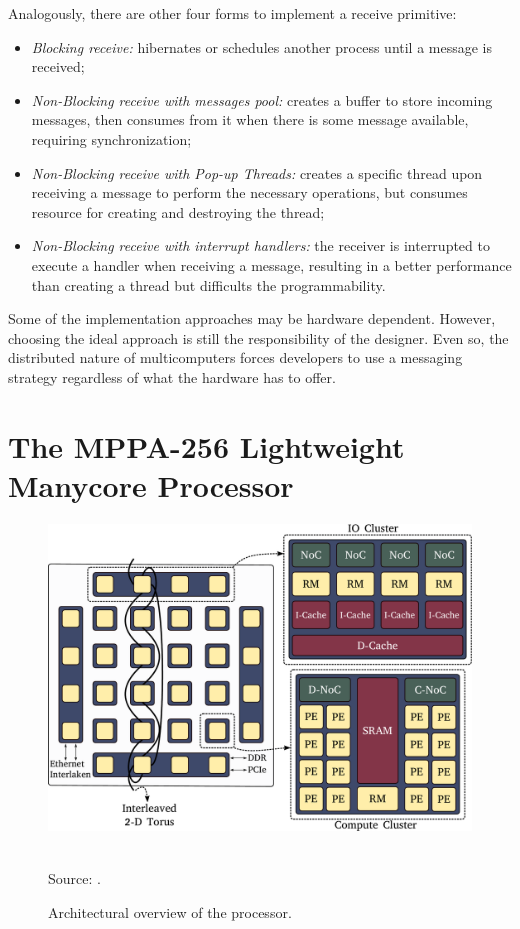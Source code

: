 				Analogously, there are other four forms to implement a receive primitive:
				\begin{itemize}
					\item \textit{Blocking receive:} \cpu hibernates or schedules another
						process until a message is received;
					\item \textit{Non-Blocking receive with messages pool:} \cpu creates
						a buffer to store incoming messages, then consumes from it when
						there is some message available, requiring synchronization;
					\item \textit{Non-Blocking receive with Pop-up Threads:} creates a specific
						thread upon receiving a message to perform the necessary operations,
						but consumes resource for creating and destroying the thread;
					\item \textit{Non-Blocking receive with interrupt handlers:} the receiver
						is interrupted to execute a handler when receiving a message, resulting
						in a better performance than creating a thread but difficults
						the programmability.
				\end{itemize}

				Some of the implementation approaches may be hardware dependent.
				However, choosing the ideal approach is still the responsibility of the \os designer.
				Even so, the distributed nature of multicomputers forces developers to
				use a messaging strategy regardless of what the hardware has to offer.

\section{The MPPA-256 Lightweight Manycore Processor}
\label{sec.mppa}

	\begin{figure}[t]
		\centering
		\caption{Architectural overview of the \mppa processor.}

		\includegraphics[width=.7\textwidth]{images/arch-mppa.pdf}

		\\ \vspace{0.2cm}
		Source: \cite{Penna2018}.

		\label{fig.mppa-arch}
	\end{figure}

